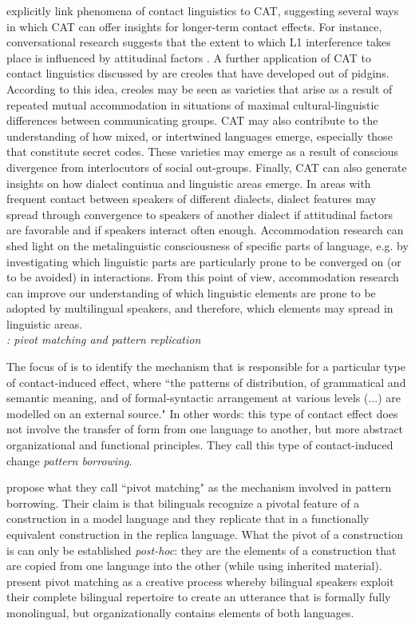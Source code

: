 \cite{niedzielskietal1996linguistic} explicitly link phenomena of contact linguistics to CAT, suggesting several ways in which CAT can offer insights for longer-term contact effects. For instance, conversational research suggests that the extent to which L1 interference takes place is influenced by attitudinal factors \parencite{giles1979ethnicity}. A further application of CAT to contact linguistics discussed by \cite{niedzielskietal1996linguistic} are creoles that have developed out of pidgins. According to this idea, creoles may be seen as varieties that arise as a result of repeated mutual accommodation in situations of maximal cultural-linguistic differences between communicating groups. CAT may also contribute to the understanding of how mixed, or intertwined languages emerge, especially those that constitute secret codes. These varieties may emerge as a result of conscious divergence from interlocutors of social out-groups. Finally, CAT can also generate insights on how dialect continua and linguistic areas emerge. In areas with frequent contact between speakers of different dialects, dialect features may spread through convergence to speakers of another dialect if attitudinal factors are favorable and if speakers interact often enough. Accommodation research can shed light on the metalinguistic consciousness of specific parts of language, e.g. by investigating which linguistic parts are particularly prone to be converged on (or to be avoided) in interactions. From this point of view, accommodation research can improve our understanding of which linguistic elements are prone to be adopted by multilingual speakers, and therefore, which elements may spread in linguistic areas.\\

\noindent \emph{\cite{matras&sakel2007}: pivot matching and pattern replication}

\noindent The focus of \cite{matras&sakel2007} is to identify the mechanism that is responsible for a particular type of contact-induced effect, where ``the patterns of distribution, of grammatical and semantic meaning, and of formal-syntactic arrangement at various levels (...) are modelled on an external source." In other words: this type of contact effect does not involve the transfer of form from one language to another, but more abstract organizational and functional principles. They call this type of contact-induced change \emph{pattern borrowing}.

\textcite{matras&sakel2007} propose what they call ``pivot matching" as the mechanism involved in pattern borrowing. Their claim is that bilinguals recognize a pivotal feature  of a construction in a model language and they replicate that in a functionally equivalent construction in the replica language. What the pivot of a construction is can only be established \emph{post-hoc}: they are the elements of a construction that are copied from one language into the other (while using inherited material). \cite{matras&sakel2007} present pivot matching as a creative process whereby bilingual speakers exploit their complete bilingual repertoire to create an utterance that is formally fully monolingual, but organizationally contains elements of both languages.

